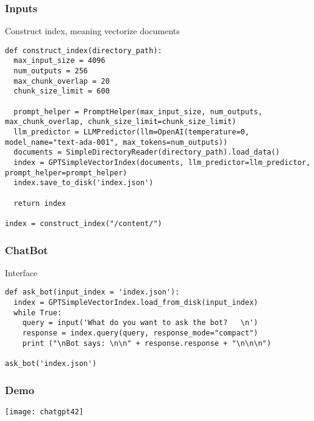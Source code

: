 \begin{frame}[fragile]\frametitle{Inputs}

Construct index, meaning vectorize documents

\begin{lstlisting}
def construct_index(directory_path):
  max_input_size = 4096
  num_outputs = 256
  max_chunk_overlap = 20
  chunk_size_limit = 600

  prompt_helper = PromptHelper(max_input_size, num_outputs, max_chunk_overlap, chunk_size_limit=chunk_size_limit)
  llm_predictor = LLMPredictor(llm=OpenAI(temperature=0, model_name="text-ada-001", max_tokens=num_outputs))
  documents = SimpleDirectoryReader(directory_path).load_data()
  index = GPTSimpleVectorIndex(documents, llm_predictor=llm_predictor, prompt_helper=prompt_helper)
  index.save_to_disk('index.json')

  return index
	
index = construct_index("/content/")
\end{lstlisting}

\end{frame}

\begin{frame}[fragile]\frametitle{ChatBot}

Interface

\begin{lstlisting}
def ask_bot(input_index = 'index.json'):
  index = GPTSimpleVectorIndex.load_from_disk(input_index)
  while True:
    query = input('What do you want to ask the bot?   \n')
    response = index.query(query, response_mode="compact")
    print ("\nBot says: \n\n" + response.response + "\n\n\n")
		
ask_bot('index.json')
\end{lstlisting}

\end{frame}

\begin{frame}[fragile]\frametitle{Demo}

\begin{center}
\texttt{[image: chatgpt42]}
\end{center}		


\end{frame}



